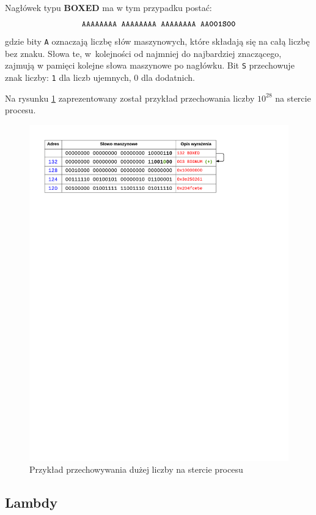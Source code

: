 Nagłówek typu \textbf{BOXED} ma w tym przypadku postać:
$$\texttt{AAAAAAAA AAAAAAAA AAAAAAAA AA\textbf{001S00}}$$
gdzie bity \texttt{A} oznaczają liczbę słów maszynowych, które składają się na całą liczbę bez znaku. Słowa te, w~kolejności od najmniej do najbardziej znaczącego, zajmują w pamięci kolejne słowa maszynowe po nagłówku. Bit \texttt{S} przechowuje znak liczby: \texttt{1} dla liczb ujemnych, {0} dla dodatnich.

Na rysunku \ref{fig:bignumonheap} zaprezentowany został przykład przechowania liczby $10^{28}$ na stercie procesu.

\begin{figure}[h]
\centerline{\includegraphics[scale=1, clip, trim=10mm 223mm 45mm 10mm]{bignum_on_heap}}
\caption{Przykład przechowywania dużej liczby na stercie procesu}
\label{fig:bignumonheap}
\end{figure}

\subsection{Lambdy}
\label{sub:typyLambda}

